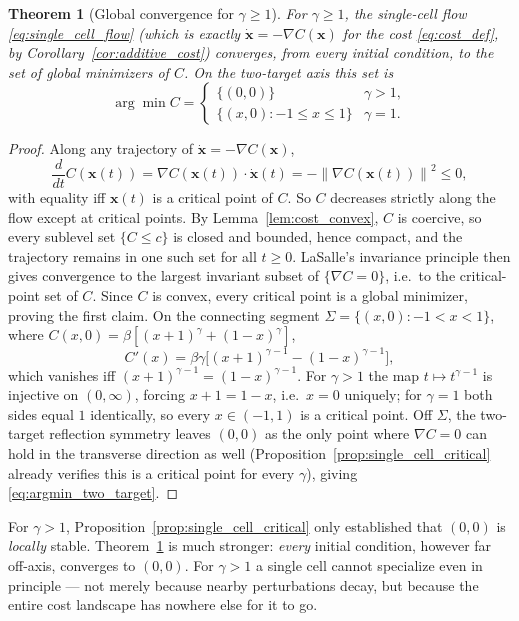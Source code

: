 \documentclass[11pt,a4paper]{article}
\theoremstyle{plain}
\newtheorem{theorem}{Theorem}[section]
\theoremstyle{definition}
\theoremstyle{remark}
\newcommand{\bx}{\bm{x}}
\newcommand{\norm}[1]{\left\lVert #1\right\rVert}
\newcommand{\bw}{\beta}
\begin{document}
\begin{theorem}[Global convergence for $\gamma\ge1$]
\label{thm:global_convergence}
For $\gamma\ge1$, the single-cell flow \eqref{eq:single_cell_flow} (which is
exactly $\dot{\bx}=-\nabla C(\bx)$ for the cost \eqref{eq:cost_def}, by
Corollary~\ref{cor:additive_cost}) converges, from \emph{every} initial
condition, to the set of global minimizers of $C$. On the two-target axis
this set is
\begin{equation}
  \boxed{
  \arg\min C=
  \begin{cases}
  \{(0,0)\} & \gamma>1,\\[2pt]
  \{(x,0):-1\le x\le1\} & \gamma=1.
  \end{cases}
  }
  \label{eq:argmin_two_target}
\end{equation}
\end{theorem}
\begin{proof}
Along any trajectory of $\dot{\bx}=-\nabla C(\bx)$,
\[
  \frac{d}{dt}C(\bx(t))=\nabla C(\bx(t))\cdot\dot{\bx}(t)=-\norm{\nabla C(\bx(t))}^2\le0,
\]
with equality iff $\bx(t)$ is a critical point of $C$. So $C$ decreases
strictly along the flow except at critical points. By
Lemma~\ref{lem:cost_convex}, $C$ is coercive, so every sublevel set
$\{C\le c\}$ is closed and bounded, hence compact, and the trajectory
remains in one such set for all $t\ge0$. LaSalle's invariance principle
then gives convergence to the largest invariant subset of
$\{\nabla C=0\}$, i.e.\ to the critical-point set of $C$. Since $C$ is
convex, every critical point is a global minimizer, proving the first
claim. On the connecting segment $\Sigma=\{(x,0):-1<x<1\}$, where
$C(x,0)=\bw[(x+1)^\gamma+(1-x)^\gamma]$,
\[
  C'(x)=\bw\gamma\big[(x+1)^{\gamma-1}-(1-x)^{\gamma-1}\big],
\]
which vanishes iff $(x+1)^{\gamma-1}=(1-x)^{\gamma-1}$. For $\gamma>1$ the
map $t\mapsto t^{\gamma-1}$ is injective on $(0,\infty)$, forcing $x+1=1-x$,
i.e.\ $x=0$ uniquely; for $\gamma=1$ both sides equal $1$ identically, so
every $x\in(-1,1)$ is a critical point. Off $\Sigma$, the two-target
reflection symmetry leaves $(0,0)$ as the only point where $\nabla C=0$ can
hold in the transverse direction as well (Proposition~\ref{prop:single_cell_critical}
already verifies this is a critical point for every $\gamma$), giving
\eqref{eq:argmin_two_target}.
\end{proof}

\begin{warningbox}
For $\gamma>1$, Proposition~\ref{prop:single_cell_critical} only established
that $(0,0)$ is \emph{locally} stable. Theorem~\ref{thm:global_convergence}
is much stronger: \emph{every} initial condition, however far off-axis,
converges to $(0,0)$. For $\gamma>1$ a single cell cannot specialize even in
principle — not merely because nearby perturbations decay, but because the
entire cost landscape has nowhere else for it to go.
\end{warningbox}
\end{document}
